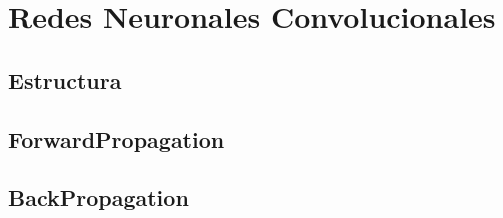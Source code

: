 \chapter{Redes Neuronales Convolucionales}

\section{Estructura}
\section{ForwardPropagation}
\section{BackPropagation}
